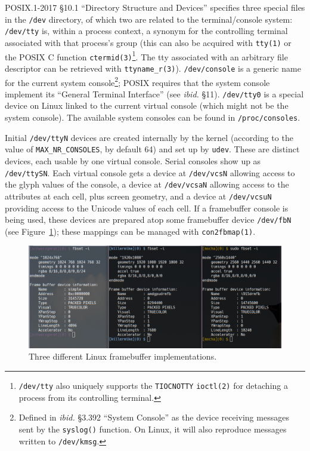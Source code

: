 POSIX.1-2017\cite{posix2017} §10.1 ``Directory Structure and Devices''
specifies three special files in the \texttt{/dev} directory, of which two are
related to the terminal/console system: \texttt{/dev/tty} is, within a process
context, a synonym for the controlling terminal associated with that process's
group (this can also be acquired with \texttt{tty(1)} or the POSIX C function
\texttt{ctermid(3)}\footnote{\texttt{/dev/tty} also uniquely supports the
\texttt{TIOCNOTTY} \texttt{ioctl(2)} for detaching a process from its
controlling terminal.}. The tty associated with an arbitrary file descriptor can
be retrieved with \texttt{ttyname\_r(3)}). \texttt{/dev/console} is a generic name for the current system console\footnote{Defined in \textit{ibid.} §3.392
``System Console'' as the device receiving messages sent by the \texttt{syslog()}
function. On Linux, it will also reproduce messages written to \texttt{/dev/kmsg}\cite{dmesg}.};
POSIX requires that the system console implement its ``General Terminal Interface'' (see
\textit{ibid.} §11). \texttt{/dev/tty0} is a special device on Linux linked to
the current virtual console (which might not be the system console). The
available system consoles can be found in \texttt{/proc/consoles}.

Initial \texttt{/dev/ttyN} devices are created internally by the kernel
(according to the value of \texttt{MAX\_NR\_CONSOLES}, by default 64) and set
up by \texttt{udev}. These are distinct devices, each usable by one virtual
console. Serial consoles show up as \texttt{/dev/ttySN}\cite{ttys4}. Each
virtual console gets a device at \texttt{/dev/vcsN} allowing access to the
glyph values of the console, a device at \texttt{/dev/vcsaN} allowing access to
the attributes at each cell, plus screen geometry, and a device at \texttt{/dev/vcsuN}
providing access to the Unicode values of each cell\cite{vcs4}. If a framebuffer console
is being used, these devices are prepared atop some framebuffer device \texttt{/dev/fbN} (see
Figure~\ref{fig:framebuffers}); these mappings can be managed with \texttt{con2fbmap(1)}.

\begin{figure}[!htbp]
  \centering
  \includegraphics[width=.75\linewidth]{media/framebuffers.png}
  \caption{Three different Linux framebuffer implementations.}
  \label{fig:framebuffers}
\end{figure}

